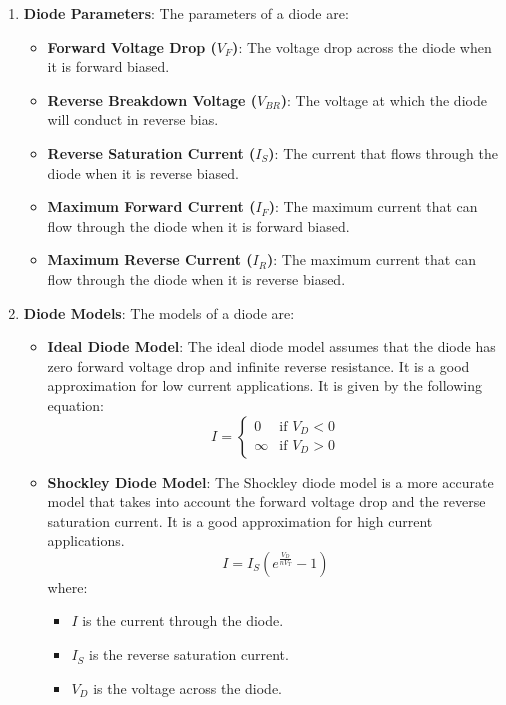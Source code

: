 \begin{enumerate}
\begin{itemize}
        SMBJ series (surface-mount).
    \end{itemize}
  \item \textbf{Diode Parameters}:
    The parameters of a diode are:
    \begin{itemize}
      \item \textbf{Forward Voltage Drop (\(V_F\))}: The voltage drop
        across the diode when it is forward biased.
      \item \textbf{Reverse Breakdown Voltage (\(V_{BR}\))}: The voltage
        at which the diode will conduct in reverse bias.
      \item \textbf{Reverse Saturation Current (\(I_S\))}: The current
        that flows through the diode when it is reverse biased.
      \item \textbf{Maximum Forward Current (\(I_F\))}: The maximum
        current that can flow through the diode when it is forward biased.
      \item \textbf{Maximum Reverse Current (\(I_R\))}: The maximum
        current that can flow through the diode when it is reverse biased.
    \end{itemize}
  \item \textbf{Diode Models}:
    The models of a diode are:
    \begin{itemize}
      \item \textbf{Ideal Diode Model}: The ideal diode model assumes
        that the diode has zero forward voltage drop and infinite reverse
        resistance. It is a good approximation for low current applications.
        It is given by the following equation:
        \[
          I = \begin{cases}
            0 & \text{if } V_D < 0 \\
            \infty & \text{if } V_D > 0
          \end{cases}
        \]
      \item \textbf{Shockley Diode Model}: The Shockley diode model
        is a more accurate model that takes into account the forward voltage
        drop and the reverse saturation current. It is a good approximation
        for high current applications.
        \[
          I = I_S \left( e^{\frac{V_D}{n V_T}} - 1 \right)
        \]
        where:
        \begin{itemize}
          \item \(I\) is the current through the diode.
          \item \(I_S\) is the reverse saturation current.
          \item \(V_D\) is the voltage across the diode.

\end{itemize}
\end{itemize}
\end{enumerate}
